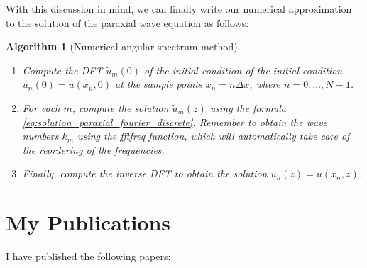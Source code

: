 \documentclass[a4paper,10pt]{report}
\newtheorem{alg}{Algorithm}
\begin{document}
With this discussion in mind, we can finally write our numerical approximation to the solution of the paraxial wave equation as follows:
\begin{alg}[Numerical angular spectrum method]
\leavevmode
\begin{enumerate}
    \item Compute the DFT $\tilde{u}_m(0)$ of the initial condition of the initial condition $u_n(0) = u(x_n,0)$ at the sample points $x_n = n \Delta x$, where $n = 0, \ldots, N-1$.
    \item For each $m$, compute the solution $\tilde{u}_m(z)$ using the formula \eqref{eq:solution_paraxial_fourier_discrete}. Remember to obtain the wave numbers $k_m$ using the fftfreq function, which will automatically take care of the reordering of the frequencies.
    \item Finally, compute the inverse DFT to obtain the solution $u_n(z) = u(x_n,z)$.
\end{enumerate}
\end{alg}

\chapter{My Publications}

I have published the following papers: \cite{PhysRevA.108.013503, DEOLIVEIRA2024110983, 48bj-bm8b}



\end{document}
